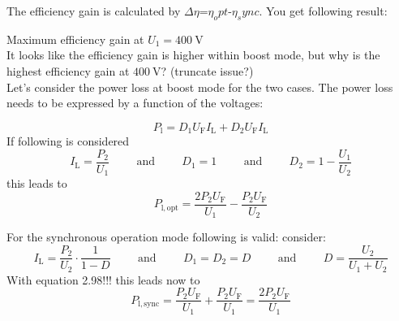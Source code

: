 \begin{solutionblock}
    The efficiency gain is calculated by $\Delta \eta$=$\eta_opt$-$\eta_sync$.
    You get following result:

    
    
    Maximum efficiency gain at $U_\mathrm{1}=\SI{400}{\volt}$ \\
    It looks like the efficiency gain is higher within boost mode, but why is the highest efficiency gain at $\SI{400}{\volt}$? (truncate issue?) \\
    Let's consider the power loss at boost mode for the two cases. The power loss needs to be expressed by a function of the voltages:

    \begin{equation}
        P_\mathrm{l}=D_1 U_\mathrm{F} I_\mathrm{L} + D_2 U_\mathrm{F} I_\mathrm{L}
    \end{equation}
    If following is considered
    \begin{equation}
        I_\mathrm{L}=\frac{P_\mathrm{2}}{U_\mathrm{1}} 
        \hspace{1cm} \mathrm{and} \hspace{1cm}
        D_1=1
        \hspace{1cm} \mathrm{and} \hspace{1cm}
        D_2=1-\frac{U_\mathrm{1}}{U_\mathrm{2}} 
    \end{equation}
    this leads to
    \begin{equation}
        P_\mathrm{l,opt}=\frac{2 P_\mathrm{2} U_\mathrm{F}}{U_\mathrm{1}} - \frac{P_\mathrm{2} U_\mathrm{F}}{U_\mathrm{2}}
    \end{equation}

    For the synchronous operation mode following is valid:
    consider:
    \begin{equation}
        I_\mathrm{L}=\frac{P_\mathrm{2}}{U_\mathrm{2}} \cdot \frac{1}{1-D}  
        \hspace{1cm} \mathrm{and} \hspace{1cm}
        D_1=D_2=D
        \hspace{1cm} \mathrm{and} \hspace{1cm}
        D=\frac{U_\mathrm{2}}{U_\mathrm{1}+U_\mathrm{2}} 
    \end{equation}
    With equation 2.98!!! this leads now to
    \begin{equation}
        P_\mathrm{l,sync}=\frac{P_\mathrm{2} U_\mathrm{F}}{U_\mathrm{1}} + \frac{P_\mathrm{2} U_\mathrm{F}}{U_\mathrm{1}}=\frac{2 P_\mathrm{2} U_\mathrm{F}}{U_\mathrm{1}}
    \end{equation}


\end{solutionblock}
